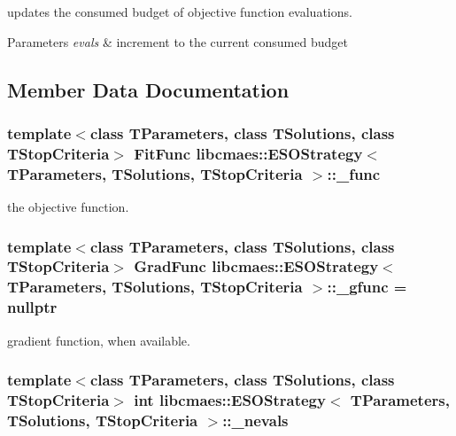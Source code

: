 updates the consumed budget of objective function evaluations. 


\begin{DoxyParams}{Parameters}
{\em evals} & increment to the current consumed budget \\
\hline
\end{DoxyParams}


\subsection{Member Data Documentation}
\hypertarget{classlibcmaes_1_1ESOStrategy_a1a29d4c30bbdb6021920275e81fa4dc4}{
\subsubsection[{\-\_\-func}]{\setlength{\rightskip}{0pt plus 5cm}template$<$class T\-Parameters, class T\-Solutions, class T\-Stop\-Criteria$>$ Fit\-Func {\bf libcmaes\-::\-E\-S\-O\-Strategy}$<$ T\-Parameters, T\-Solutions, T\-Stop\-Criteria $>$\-::\-\_\-func}}\label{classlibcmaes_1_1ESOStrategy_a1a29d4c30bbdb6021920275e81fa4dc4}
the objective function. \hypertarget{classlibcmaes_1_1ESOStrategy_a76926e49a2ca941a22362167bc230093}{
\subsubsection[{\-\_\-gfunc}]{\setlength{\rightskip}{0pt plus 5cm}template$<$class T\-Parameters, class T\-Solutions, class T\-Stop\-Criteria$>$ Grad\-Func {\bf libcmaes\-::\-E\-S\-O\-Strategy}$<$ T\-Parameters, T\-Solutions, T\-Stop\-Criteria $>$\-::\-\_\-gfunc = nullptr}}\label{classlibcmaes_1_1ESOStrategy_a76926e49a2ca941a22362167bc230093}
gradient function, when available. \hypertarget{classlibcmaes_1_1ESOStrategy_a19667f1e69856e7cfd6219b63cbaa59d}{
\subsubsection[{\-\_\-nevals}]{\setlength{\rightskip}{0pt plus 5cm}template$<$class T\-Parameters, class T\-Solutions, class T\-Stop\-Criteria$>$ int {\bf libcmaes\-::\-E\-S\-O\-Strategy}$<$ T\-Parameters, T\-Solutions, T\-Stop\-Criteria $>$\-::\-\_\-nevals}}\label{classlibcmaes_1_1ESOStrategy_a19667f1e69856e7cfd6219b63cbaa59d}
